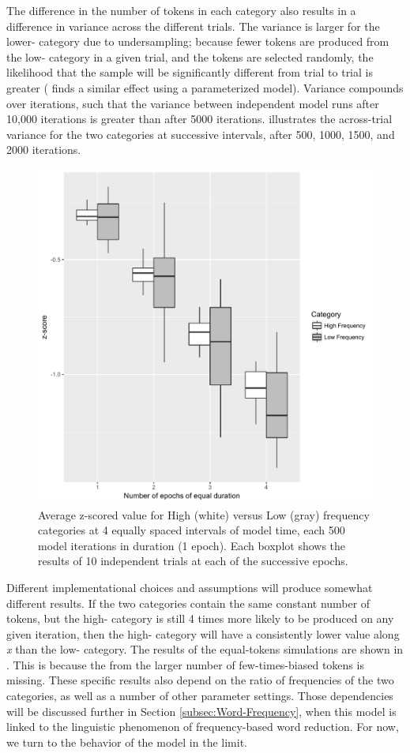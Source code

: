 The difference in the number of tokens in each category also results
in a difference in variance across the different trials. The variance
is larger for the lower- category due to undersampling; because
fewer tokens are produced from the low- category in a given
trial, and the tokens are selected randomly, the likelihood that the
sample will be significantly different from trial to trial is greater
(\citealt{Soskuthy} finds a similar effect using a parameterized 
model). Variance compounds over iterations, such that the variance
between independent model runs after 10,000 iterations is greater
than after 5000 iterations.  illustrates
the across-trial variance for the two categories at successive intervals,
after 500, 1000, 1500, and 2000 iterations.

\begin{figure}[H]
\centering{}\includegraphics[width=.75\textwidth]{figures/FrequencyOverTime.pdf}\caption{\label{fig:Frequency Catch Up}Average z-scored value for High (white)
versus Low (gray) frequency categories at 4 equally spaced intervals
of model time, each 500 model iterations in duration (1 epoch). Each boxplot shows
the results of 10 independent trials at each of the successive epochs.}
\end{figure}

Different implementational choices and assumptions will produce somewhat
different results. If the two categories contain the same constant
number of tokens, but the high- category is still 4 times
more likely to be produced on any given iteration, then the high-
category will have a consistently lower value along \emph{x} than
the low- category. The results of the equal-tokens simulations are shown in .
This is because the  from the larger number of few-times-biased
tokens is missing. These specific results also depend on the ratio
of frequencies of the two categories, as well as a number of other
parameter settings. Those dependencies will be discussed further in
Section \ref{subsec:Word-Frequency}, when this model is linked to
the linguistic phenomenon of frequency-based word reduction. For now,
we turn to the behavior of the model in the limit.

